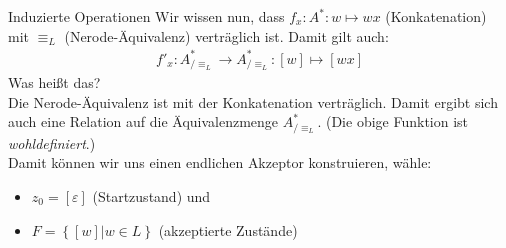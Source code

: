 \begin{frame}{Induzierte Operationen}
    Wir wissen nun, dass $f_x : A^*:w\mapsto wx$ (Konkatenation) mit $\equiv_L$ (Nerode-Äquivalenz) verträglich ist. Damit gilt auch:
    \pause
    \begin{align*}
        f'_x : A_{/\equiv_L}^* \rightarrow A_{/\equiv_L}^*:[w]\mapsto[wx]
    \end{align*}
    Was heißt das?\\
    \pause
    Die Nerode-Äquivalenz ist mit der Konkatenation verträglich. Damit ergibt sich auch eine Relation auf die Äquivalenzmenge $A_{/\equiv_L}^*$. (Die obige Funktion ist \emph{wohldefiniert}.)\\
    \pause
    Damit können wir uns einen endlichen Akzeptor konstruieren, wähle:
    \begin{itemize}
        \item $z_0 = [\varepsilon]$ (Startzustand) und
        \item $F = \left\{ [w] | w\in L \right\}$ (akzeptierte Zustände)
    \end{itemize}
\end{frame}
